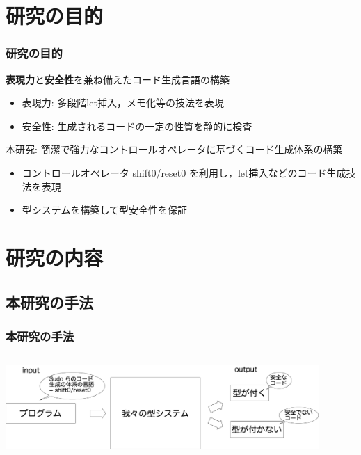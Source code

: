 \section{研究の目的}
\begin{frame}
  \frametitle{研究の目的}

  \begin{block}{\textbf{表現力}と\textbf{安全性}を兼ね備えたコード生成言語の構築}
    \begin{itemize}
    \item 表現力: 多段階let挿入，メモ化等の技法を表現
    \item 安全性: 生成されるコードの一定の性質を静的に検査
    \end{itemize}
  \end{block}

  \medskip
  \pause
  \begin{block}{本研究: 簡潔で強力なコントロールオペレータに基づくコード生成体系の構築}
    \begin{itemize}
    \item コントロールオペレータ shift0/reset0 を利用し，let挿入などのコード生成技法を表現
    \item 型システムを構築して型安全性を保証
    \end{itemize}
  \end{block}
\end{frame}

\section{研究の内容}
\subsection{本研究の手法}
\begin{frame}
  \frametitle{本研究の手法}
  \begin{columns}
    \begin{column}{1.\textwidth}%
      \center
      \includegraphics[clip,height=3.2cm]{./img/code_s0r0.png}
    \end{column}
  \end{columns}
\end{frame}

